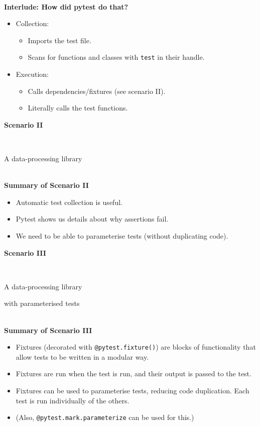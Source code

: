 \documentclass[12pt]{article}
\newlength{\geometrytop}
\newcommand{\slidetitle}[1]{~\\[-0.5ex]{\Large\bf{\color{bold}#1}}\\}
\begin{document}
\slidetitle{Interlude: How did pytest do that?}
\begin{itemize}
\item Collection:
\begin{itemize}
\item Imports the test file.
\item Scans for functions and classes with \verb|test| in their handle.
\end{itemize}
\item Execution:
\begin{itemize}
\item Calls dependencies/fixtures (see scenario II).
\item Literally calls the test functions.
\end{itemize}
\end{itemize}
\clearpage

\thispagestyle{plain}
\vspace*{-\topskip}
\vspace*{\fill}
{\Huge\centerline{\textbf{Scenario II}}~\newline
\centerline{A data-processing library}}
\vspace*{\fill}
\vspace*{\geometrytop}
\clearpage

\slidetitle{Summary of Scenario II}
\begin{itemize}
\item Automatic test collection is useful.
\item Pytest shows us details about why assertions fail.
\item We need to be able to parameterise tests (without duplicating code).
\end{itemize}
\clearpage

\thispagestyle{plain}
\vspace*{-\topskip}
\vspace*{\fill}
{\Huge\centerline{\textbf{Scenario III}}~\newline
\centerline{A data-processing library}
\centerline{with parameterised tests}}
\vspace*{\fill}
\vspace*{\geometrytop}
\clearpage

\slidetitle{Summary of Scenario III}
\begin{itemize}
\item Fixtures (decorated with \verb|@pytest.fixture()|) are blocks of
    functionality that allow tests to be written in a modular way.
\item Fixtures are run when the test is run, and their output is passed to the
    test.
\item Fixtures can be used to parameterise tests, reducing code
    duplication. Each test is run individually of the others.
\item (Also, \verb|@pytest.mark.parameterize| can be used for this.)
\end{itemize}
\clearpage
\end{document}

